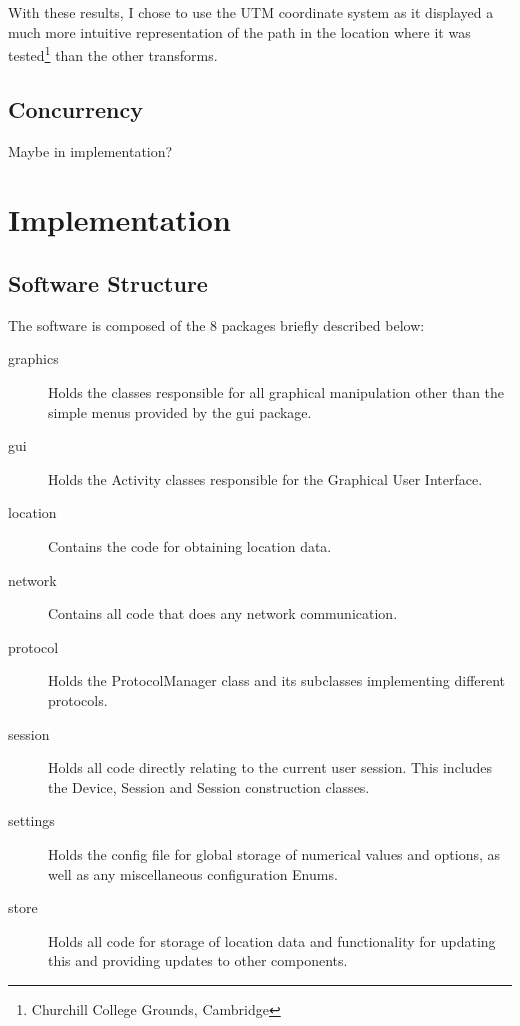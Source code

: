 With these results, I chose to use the UTM coordinate system as it displayed a much more intuitive representation of the path in the location where it was tested\footnote{Churchill College Grounds, Cambridge} than the other transforms.

\section{Concurrency}

Maybe in implementation?

\cleardoublepage
\chapter{Implementation}

\section{Software Structure}

The software is composed of the 8 packages briefly described below:
\begin{description}
\item[graphics]{Holds the classes responsible for all graphical manipulation other than the simple menus provided by the gui package.}
\item[gui]{Holds the Activity classes responsible for the Graphical User Interface.}
\item[location]{Contains the code for obtaining location data.}
\item[network]{Contains all code that does any network communication.}
\item[protocol]{Holds the ProtocolManager class and its subclasses implementing different protocols.}
\item[session]{Holds all code directly relating to the current user session. This includes the Device, Session and Session construction classes.}
\item[settings]{Holds the config file for global storage of numerical values and options, as well as any miscellaneous configuration Enums.}
\item[store]{Holds all code for storage of location data and functionality for updating this and providing updates to other components.}
\end{description}

